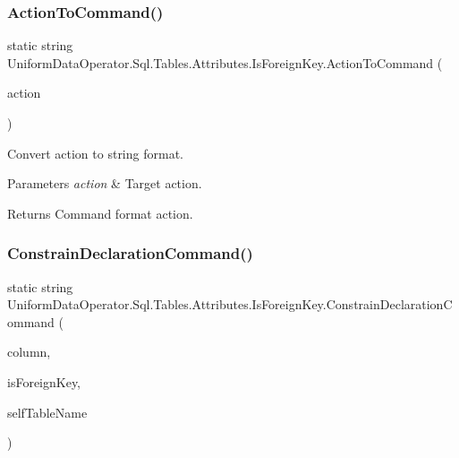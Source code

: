 \subsubsection{\texorpdfstring{Action\+To\+Command()}{ActionToCommand()}}
{\footnotesize\ttfamily static string Uniform\+Data\+Operator.\+Sql.\+Tables.\+Attributes.\+Is\+Foreign\+Key.\+Action\+To\+Command (\begin{DoxyParamCaption}\item[{Action}]{action }\end{DoxyParamCaption})\hspace{0.3cm}{\ttfamily [static]}}



Convert action to string format. 


\begin{DoxyParams}{Parameters}
{\em action} & Target action.\\
\hline
\end{DoxyParams}
\begin{DoxyReturn}{Returns}
Command format action.
\end{DoxyReturn}
\mbox{\label{class_uniform_data_operator_1_1_sql_1_1_tables_1_1_attributes_1_1_is_foreign_key_acb7820f8c51d0db5699080495cb97900}} 
\subsubsection{\texorpdfstring{Constrain\+Declaration\+Command()}{ConstrainDeclarationCommand()}\hspace{0.1cm}{\footnotesize\ttfamily [1/2]}}
{\footnotesize\ttfamily static string Uniform\+Data\+Operator.\+Sql.\+Tables.\+Attributes.\+Is\+Foreign\+Key.\+Constrain\+Declaration\+Command (\begin{DoxyParamCaption}\item[{\mbox{\hyperlink{class_uniform_data_operator_1_1_sql_1_1_tables_1_1_attributes_1_1_column}{Column}}}]{column,  }\item[{\mbox{\hyperlink{class_uniform_data_operator_1_1_sql_1_1_tables_1_1_attributes_1_1_is_foreign_key}{Is\+Foreign\+Key}}}]{is\+Foreign\+Key,  }\item[{string}]{self\+Table\+Name }\end{DoxyParamCaption})\hspace{0.3cm}{\ttfamily [static]}}



